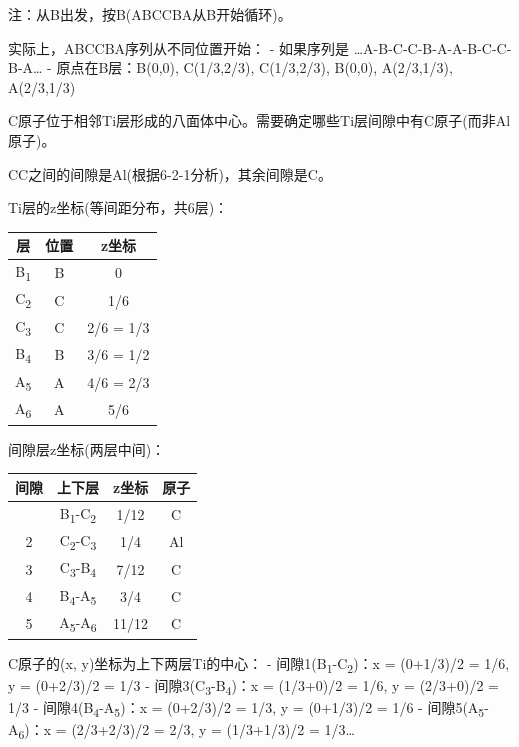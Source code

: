 \documentclass[a4paper,11pt]{ctexart}
\newcounter{none}
\newcommand{\箭}{\ensuremath{\rightarrow}}
\newcommand{\左箭}{\ensuremath{\leftarrow}}
\newcommand{\上箭}{\ensuremath{\uparrow}}
\newcommand{\下箭}{\ensuremath{\downarrow}}
\newcommand{\衡}{\ensuremath{\rightleftharpoons}}
\newcommand{\双箭}{\ensuremath{\leftrightarrow}}
\newcommand{\约等于}{\ensuremath{\approx}}
\newcommand{\小于等于}{\ensuremath{\leq}}
\newcommand{\大于等于}{\ensuremath{\geq}}
\newcommand{\不等于}{\ensuremath{\neq}}
\newcommand{\西格马}{\ensuremath{\sigma}}
\newcommand{\派}{\ensuremath{\pi}}
\begin{document}
注：从B出发，按B(ABCCBA从B开始循环)。

实际上，ABCCBA序列从不同位置开始：
- 如果序列是 \ldots A-B-C-C-B-A-A-B-C-C-B-A\ldots{}
- 原点在B层：B(0,0), C(1/3,2/3), C(1/3,2/3), B(0,0), A(2/3,1/3), A(2/3,1/3)

C原子位于相邻Ti层形成的八面体中心。需要确定哪些Ti层间隙中有C原子(而非Al原子)。

CC之间的间隙是Al(根据6-2-1分析)，其余间隙是C。

Ti层的z坐标(等间距分布，共6层)：

{\def\LTcaptype{none} %
\begin{longtable}[]{@{}ccc@{}}
\toprule\noalign{}
层 & 位置 & z坐标 \\
\midrule\noalign{}
\endhead
\bottomrule\noalign{}
\endlastfoot
B\textsubscript{1} & B & 0 \\
C\textsubscript{2} & C & 1/6 \\
C\textsubscript{3} & C & 2/6 = 1/3 \\
B\textsubscript{4} & B & 3/6 = 1/2 \\
A\textsubscript{5} & A & 4/6 = 2/3 \\
A\textsubscript{6} & A & 5/6 \\
\end{longtable}
}

间隙层z坐标(两层中间)：

{\def\LTcaptype{none} %
\begin{longtable}[]{@{}cccc@{}}
\toprule\noalign{}
间隙 & 上下层 & z坐标 & 原子 \\
\midrule\noalign{}
\endhead
\bottomrule\noalign{}
\endlastfoot
1 & B\textsubscript{1}-C\textsubscript{2} & 1/12 & C \\
2 & C\textsubscript{2}-C\textsubscript{3} & 1/4 & Al \\
3 & C\textsubscript{3}-B\textsubscript{4} & 7/12 & C \\
4 & B\textsubscript{4}-A\textsubscript{5} & 3/4 & C \\
5 & A\textsubscript{5}-A\textsubscript{6} & 11/12 & C \\
\end{longtable}
}

C原子的(x, y)坐标为上下两层Ti的中心：
- 间隙1(B\textsubscript{1}-C\textsubscript{2})：x = (0+1/3)/2 = 1/6, y = (0+2/3)/2 = 1/3
- 间隙3(C\textsubscript{3}-B\textsubscript{4})：x = (1/3+0)/2 = 1/6, y = (2/3+0)/2 = 1/3
- 间隙4(B\textsubscript{4}-A\textsubscript{5})：x = (0+2/3)/2 = 1/3, y = (0+1/3)/2 = 1/6
- 间隙5(A\textsubscript{5}-A\textsubscript{6})：x = (2/3+2/3)/2 = 2/3, y = (1/3+1/3)/2 = 1/3\ldots{}
\end{document}
